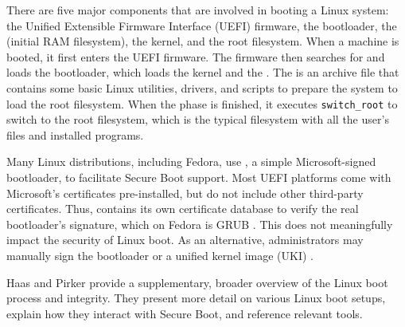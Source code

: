 There are five major components that are involved in booting a Linux system:
the Unified Extensible Firmware Interface (UEFI) firmware, the bootloader, the \initramfs (initial RAM filesystem), the kernel, and the root filesystem.
When a machine is booted, it first enters the UEFI firmware.
The firmware then searches for and loads the bootloader, which loads the kernel and the \initramfs.
The \initramfs is an archive file that contains some basic Linux utilities, drivers, and scripts to prepare the system to load the root filesystem.
When the \initramfs phase is finished, it executes \verb|switch_root| to switch to the root filesystem,
which is the typical filesystem with all the user's files and installed programs.

Many Linux distributions, including Fedora, use \shim \cite{rhboot:2026:shim}, a simple Microsoft-signed bootloader, to facilitate Secure Boot support.
Most UEFI platforms come with Microsoft's certificates pre-installed, but do not include other third-party certificates.
Thus, \shim contains its own certificate database to verify the real bootloader's signature,
which on Fedora is GRUB \cite{gnu_grub}.
This does not meaningfully impact the security of Linux boot.
As an alternative, administrators may manually sign the bootloader or a unified kernel image (UKI) \cite{gentoo_wiki_secure_boot,gentoo_wiki_secure_boot_grub}.

Haas and Pirker \cite{Haas:Linux-Boot-Integrity:2024} provide a supplementary, broader overview of the Linux boot process and integrity.
They present more detail on various Linux boot setups, explain how they interact with Secure Boot, and reference relevant tools.